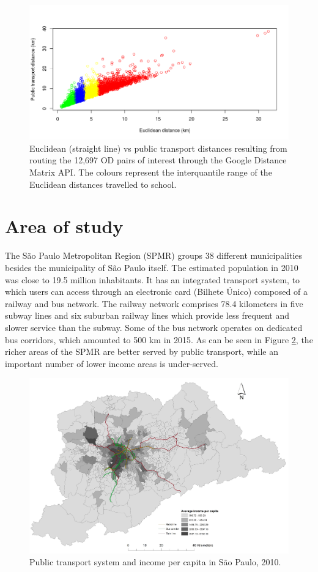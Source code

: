\documentclass[3p,authoryear,preprint,review,12pt]{elsarticle}
\begin{document}
\begin{figure}[H]
\includegraphics[width=0.5\linewidth]{public-vs-euclid-dists} \caption{Euclidean (straight line) vs public transport distances resulting from routing the 12,697 OD pairs of interest through the Google Distance Matrix API. The colours represent the interquantile range of the Euclidean distances travelled to school.}\label{fig:euclid}
\end{figure}

\section{Area of study}\label{area-of-study}

The São Paulo Metropolitan Region (SPMR) groups 38 different municipalities besides the municipality of São Paulo itself. The estimated population in 2010 was close to 19.5 million inhabitants. It has an integrated transport system, to which users can access through an electronic card (Bilhete Único) composed of a railway and bus network. The railway network comprises 78.4 kilometers in five subway lines and six suburban railway lines which provide less frequent and slower service than the subway. Some of the bus network operates on dedicated bus corridors, which amounted to 500 km in 2015. As can be seen in Figure \ref{fig:inc-trans}, the richer areas of the SPMR are better served by public transport, while an important number of lower income areas is under-served.

\begin{figure}[H]
\includegraphics[width=0.8\linewidth]{income_pc} \caption{Public transport system and income per capita in São Paulo, 2010.}\label{fig:inc-trans}
\end{figure}
\end{document}
